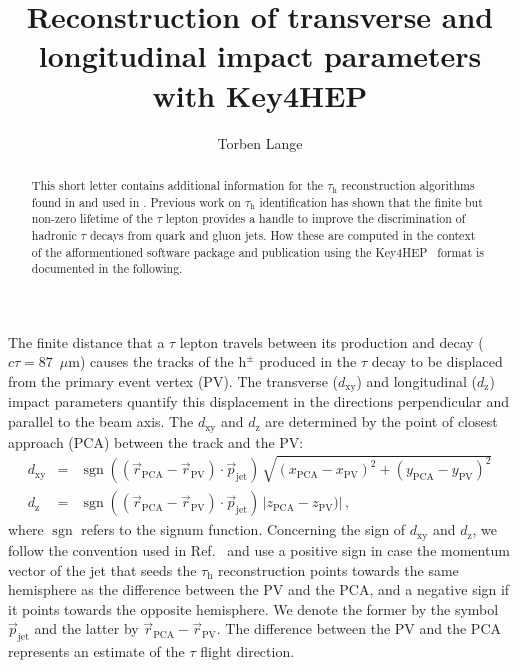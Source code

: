 \documentclass[a4paper,english,11pt]{article}
\newcommand{\Pgt}{\ensuremath{\tau}\xspace}
\newcommand{\tauh}{\ensuremath{\Pgt_{\textrm{h}}}\xspace}
\newcommand{\hpm}{\ensuremath{\textrm{h}^{\pm}}\xspace}
\newcommand{\jet}{\ensuremath{\textrm{jet}}\xspace}
\newcommand{\PCA}{\ensuremath{\textrm{PCA}}\xspace}
\newcommand{\PV}{\ensuremath{\textrm{PV}}\xspace}
\newcommand{\dxy}{\ensuremath{d_{\textrm{xy}}}\xspace}
\newcommand{\dz}{\ensuremath{d_{\textrm{z}}}\xspace}
\DeclareMathOperator{\sign}{sgn}
\begin{document}
	\title{Reconstruction of transverse and longitudinal impact parameters with Key4HEP}
	\author[1]{Torben Lange}
	\maketitle
	\begin{abstract}
		This short letter contains additional information for the $\tauh$ reconstruction algorithms found in \cite{christian_veelken_2023_8113344} and used in \cite{Lange:2023gbe}.
		Previous work on $\tauh$ identification has shown that the finite but non-zero lifetime of the $\Pgt$ lepton provides a handle to improve the discrimination of hadronic $\Pgt$ decays from quark and gluon jets. How these are computed in the context of the afformentioned software package and publication using the Key4HEP~\cite{Ganis:2021vgv} format is documented in the following.
	\end{abstract}
	
	The finite distance that a $\Pgt$ lepton travels between its production and decay ($c\tau = 87$~$\mu$m) causes the tracks of the $\hpm$ produced in the $\Pgt$ decay to be displaced from the primary event vertex (PV).
	The transverse ($\dxy$) and longitudinal ($\dz$) impact parameters quantify this displacement in the directions perpendicular and parallel to the beam axis.
	The $\dxy$ and $\dz$ are determined by the point of closest approach (PCA) between the track and the PV:
	\begin{eqnarray}
		\dxy & = & \sign\left(\left( \vec{r}_{\PCA} - \vec{r}_{\PV} \right) \cdot \vec{p}_{\jet}\right) \, \sqrt{ (x_{\PCA} - x_{\PV})^{2} + (y_{\PCA} - y_{\PV})^{2}} \nonumber \\
		\dz & = & \sign\left(\left( \vec{r}_{\PCA} - \vec{r}_{\PV} \right) \cdot \vec{p}_{\jet}\right) \, \vert z_{\PCA} - z_{\PV}) \vert \, ,
		\label{eq:ImpactParameters}
	\end{eqnarray}
	where $\sign$ refers to the signum function.
	Concerning the sign of $\dxy$ and $\dz$, we follow the convention used in Ref.~\cite{CMS:2011hta} and use a positive sign in case the momentum vector of the jet that seeds the $\tauh$ reconstruction points towards the same hemisphere as the difference between the PV and the PCA, and a negative sign if it points towards the opposite hemisphere.
	We denote the former by the symbol $\vec{p}_{\jet}$ and the latter by $\vec{r}_{\PCA} - \vec{r}_{\PV}$.
	The difference between the PV and the PCA represents an estimate of the $\Pgt$ flight direction.
	
\end{document}
